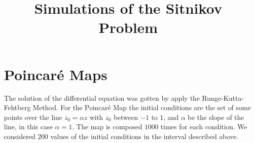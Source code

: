 \documentclass[]{article}
\title{Simulations of the Sitnikov Problem}
\author{}
\begin{document}
\maketitle



\section*{Poincaré Maps}

The solution of the differential equation was gotten by apply the Runge-Kutta-Fehtberg Method. For the Poincaré Map the initial conditions are the set of some points over the line $\dot{z_0}=\alpha z$ with $z_0$ between $-1$ to $1$, and $\alpha$ be the slope of the line, in this case $\alpha=1$. The map is composed $1000$ times for each condition. We considered $200$ values of the initial conditions in the interval described above.\\
\end{document}
